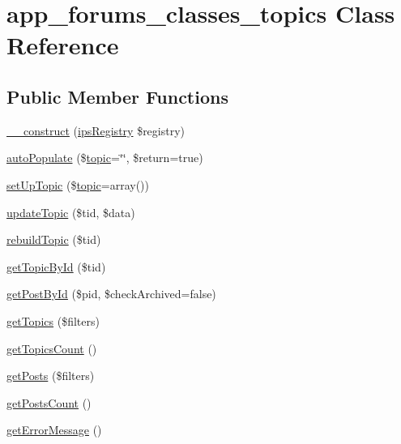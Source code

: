 \hypertarget{classapp__forums__classes__topics}{\section{app\-\_\-forums\-\_\-classes\-\_\-topics Class Reference}
\label{classapp__forums__classes__topics}
}
\subsection*{Public Member Functions}
\begin{DoxyCompactItemize}
\item 
\hyperlink{classapp__forums__classes__topics_a178c3a93e57e75dd87a5d39112af0b07}{\-\_\-\-\_\-construct} (\hyperlink{classips_registry}{ips\-Registry} \$registry)
\item 
\hyperlink{classapp__forums__classes__topics_ade382c064e04343c1c1e0ffd15a45bbe}{auto\-Populate} (\$\hyperlink{classtopic}{topic}=\char`\"{}\char`\"{}, \$return=true)
\item 
\hyperlink{classapp__forums__classes__topics_a684b4aab2e3bbb55407d9615be7b1ea5}{set\-Up\-Topic} (\$\hyperlink{classtopic}{topic}=array())
\item 
\hyperlink{classapp__forums__classes__topics_a0669630528c6213a70ea52f4eaa3726e}{update\-Topic} (\$tid, \$data)
\item 
\hyperlink{classapp__forums__classes__topics_a9ae35dc4ddf7936983e623f81051500f}{rebuild\-Topic} (\$tid)
\item 
\hyperlink{classapp__forums__classes__topics_abe0edf082deb9609387506d0989305f4}{get\-Topic\-By\-Id} (\$tid)
\item 
\hyperlink{classapp__forums__classes__topics_a4dc259a82d99c53f99147fa494006ed2}{get\-Post\-By\-Id} (\$pid, \$check\-Archived=false)
\item 
\hyperlink{classapp__forums__classes__topics_ae4ee830ef61c42bbf8f179147d48d885}{get\-Topics} (\$filters)
\item 
\hyperlink{classapp__forums__classes__topics_a9e92a37adc937b590e0fe84a6b4f10cc}{get\-Topics\-Count} ()
\item 
\hyperlink{classapp__forums__classes__topics_a4d1d9482540c711f7f490c7306ad2ed5}{get\-Posts} (\$filters)
\item 
\hyperlink{classapp__forums__classes__topics_a68f42ee6c8fb0c5193e9af321ee1ab91}{get\-Posts\-Count} ()
\item 
\hyperlink{classapp__forums__classes__topics_a3d24ed0e93b212b4d5e382fa795bf4ef}{get\-Error\-Message} ()

\end{DoxyCompactItemize}
